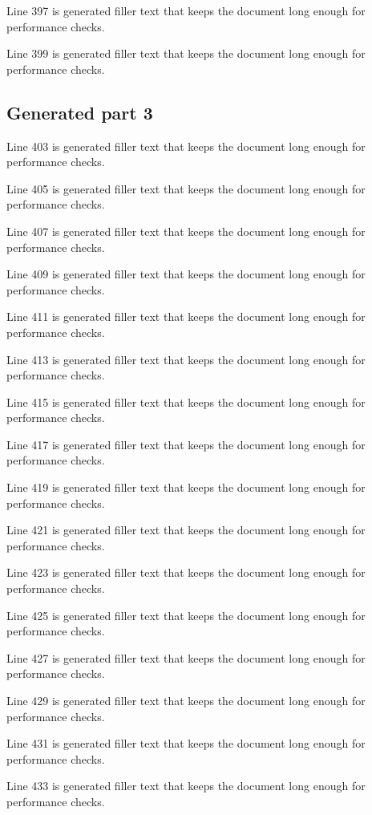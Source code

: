 Line 397 is generated filler text that keeps the document long enough for performance checks.

Line 399 is generated filler text that keeps the document long enough for performance checks.

\subsection{Generated part 3}

Line 403 is generated filler text that keeps the document long enough for performance checks.

Line 405 is generated filler text that keeps the document long enough for performance checks.

Line 407 is generated filler text that keeps the document long enough for performance checks.

Line 409 is generated filler text that keeps the document long enough for performance checks.

Line 411 is generated filler text that keeps the document long enough for performance checks.

Line 413 is generated filler text that keeps the document long enough for performance checks.

Line 415 is generated filler text that keeps the document long enough for performance checks.

Line 417 is generated filler text that keeps the document long enough for performance checks.

Line 419 is generated filler text that keeps the document long enough for performance checks.

Line 421 is generated filler text that keeps the document long enough for performance checks.

Line 423 is generated filler text that keeps the document long enough for performance checks.

Line 425 is generated filler text that keeps the document long enough for performance checks.

Line 427 is generated filler text that keeps the document long enough for performance checks.

Line 429 is generated filler text that keeps the document long enough for performance checks.

Line 431 is generated filler text that keeps the document long enough for performance checks.

Line 433 is generated filler text that keeps the document long enough for performance checks.

